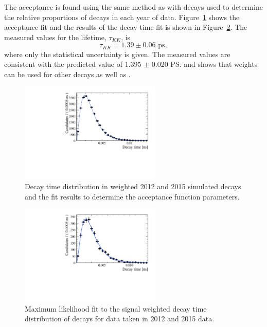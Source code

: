 The \bskk acceptance is found using the same method as \bsmumu with \bsjpsiphi decays used to determine the relative proportions of decays in each year of data. Figure~\ref{fig:bskkacceptancefit} shows the acceptance fit and the results of the decay time fit is shown in Figure~\ref{fig:bskklifetimefit}. The measured values for the lifetime, $\tau_{KK}$, is
\begin{equation}
\tau_{KK} = 1.39 \pm 0.06  \text{ ps}, 
\end{equation}
where only the statistical uncertainty is given.%
The measured values are consistent with the predicted value of 1.395 $\pm$ 0.020 \ps \cite{Aaij:2014fia} and shows that \bdkpi weights can be used for other decays as well as \bdkpi. 

\begin{figure}[htbp]
\centering
  \includegraphics[width=0.6\textwidth]{./Figs/LifetimeSystematics/Bs2KK_acceptance_Fit.pdf}
\caption{Decay time distribution in weighted 2012 and 2015 simulated decays and the fit  results to determine the acceptance function parameters. }
\label{fig:bskkacceptancefit}
\end{figure}

\begin{figure}[htbp]
\centering
  \includegraphics[width=0.6\textwidth]{./Figs/LifetimeSystematics/Bd2KPi_lifetime_fit.pdf}
\caption{Maximum likelihood fit to the signal weighted decay time distribution of \bskk decays for data taken in 2012 and 2015 data. }
\label{fig:bskklifetimefit}
\end{figure}

